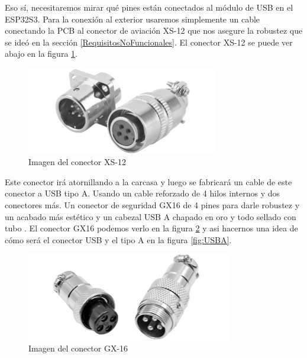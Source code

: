 Eso sí, necesitaremos mirar qué pines están conectados al módulo de \gls{USB} en el ESP32S3. Para la conexión al exterior usaremos simplemente un cable conectando la \gls{PCB} al conector de aviación XS-12 que nos asegure la robustez que se ideó en la sección \ref{RequisitosNoFuncionales}. El conector XS-12 se puede ver abajo en la figura \ref{fig:XS12}.

\begin{figure}[H]
    \centering
    \includegraphics[width=0.75\textwidth]{imagenes/Capitulos/Cap03/XS12.png}
    \caption{Imagen del conector XS-12}
    \label{fig:XS12}
\end{figure}

Este conector irá atornillando a la carcasa y luego se fabricará un cable de este conector a \gls{USB} tipo A. Usando un cable reforzado de 4 hilos internos y dos conectores más. Un conector de seguridad GX16 de 4 pines para darle robustez y un acabado más estético y un cabezal \gls{USB} A chapado en oro y todo sellado con tubo . El conector GX16 podemos verlo en la figura \ref{fig:GX16} y asi hacernos una idea de cómo será el conector \gls{USB} y el tipo A en la figura \ref{fig:USBA}.

\begin{figure}[H]
    \centering
    \includegraphics[width=0.8\textwidth]{imagenes/Capitulos/Cap03/GX16.png}
    \caption{Imagen del conector GX-16}
    \label{fig:GX16}
\end{figure}

